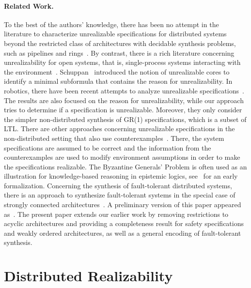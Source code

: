 \documentclass{LMCS}
\theoremstyle{plain}\newtheorem{theorem}[thm]{Theorem}
\theoremstyle{plain}\newtheorem{lemma}[thm]{Lemma}
\theoremstyle{plain}\newtheorem{proposition}[thm]{Proposition}
\theoremstyle{plain}\newtheorem{corollary}[thm]{Corollary}
\theoremstyle{definition}\newtheorem{definition}{Definition}[section]
\begin{document}
\paragraph{\bf Related Work.}
To the best of the authors' knowledge, there has been no attempt in the literature to characterize unrealizable specifications for distributed systems beyond the restricted class of architectures with decidable synthesis problems, such as pipelines and rings~\cite{DBLP:conf/lics/KupfermanV01,DBLP:conf/lics/FinkbeinerS05}.
By contrast, there is a rich literature concerning unrealizability for open systems, that is, single-process systems interacting with the environment~\cite{Church/63/Logic,DBLP:conf/icalp/AbadiLW89,conf/ictl/KupfermanV97}.
Schuppan~\cite{DBLP:journals/scp/Schuppan12} introduced the notion of unrealizable cores to identify a minimal subformula that contains the reason for unrealizability.
In robotics, there have been recent attempts to analyze unrealizable specifications~\cite{DBLP:conf/cav/RamanK11}.
The results are also focused on the reason for unrealizability, while our approach tries to determine if a specification is unrealizable.
Moreover, they only consider the simpler non-distributed synthesis of GR(1) specifications, which is a subset of LTL\@.
There are other approaches concerning unrealizable specifications in the non-distributed setting that also use counterexamples~\cite{DBLP:conf/concur/ChatterjeeHJ08,DBLP:conf/memocode/LiDS11}.
There, the system specifications are assumed to be correct and the information from the counterexamples are used to modify environment assumptions in order to make the specifications realizable.
The Byzantine Generals' Problem is often used as an illustration for knowledge-based reasoning in epistemic logics, see~\cite{DBLP:conf/podc/HalpernM84} for an early formalization.
Concerning the synthesis of fault-tolerant distributed systems, there is an approach to synthesize fault-tolerant systems in the special case of strongly connected architectures~\cite{DBLP:conf/atva/DimitrovaF09}.
A preliminary version of this paper appeared as~\cite{DBLP:conf/tacas/FinkbeinerT14}.
The present paper extends our earlier work by removing restrictions to acyclic architectures and providing a completeness result for safety specifications and weakly ordered architectures, as well as a general encoding of fault-tolerant synthesis.








\section{Distributed Realizability}
\end{document}
